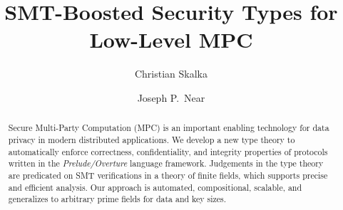 \title{SMT-Boosted Security Types for Low-Level MPC}

\author{Christian Skalka}

\author{Joseph P.~Near}

\begin{abstract}
  Secure Multi-Party Computation (MPC) is an important enabling
  technology for data privacy in modern distributed applications. We
  develop a new type theory to automatically enforce correctness,
  confidentiality, and integrity properties of protocols written in
  the \emph{Prelude/Overture} language framework. Judgements in the
  type theory are predicated on SMT verifications in a theory of
  finite fields, which supports precise and efficient analysis. Our
  approach is automated, compositional, scalable, and generalizes to arbitrary
  prime fields for data and key sizes.
\end{abstract} 

